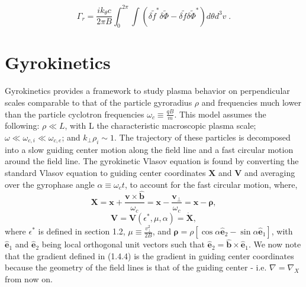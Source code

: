 \documentclass[12pt]{article}
\numberwithin{equation}{subsection}
\begin{document}
   \begin{equation}
      \Gamma_r = \frac{ik_\theta c}{2\pi B}\int_{0}^{2\pi}\int(\delta\widetilde{f}^*\delta\widetilde{\Phi}-\delta\widetilde{f}\delta\widetilde{\Phi}^*)d\theta d^{3}v\;.
   \end{equation}


\section{Gyrokinetics}
   \quad Gyrokinetics provides a framework to study plasma behavior on perpendicular scales comparable to that of the
particle gyroradius $\rho$ and frequencies much lower than the particle cyclotron frequencies $\omega_c \equiv \frac{qB}{m}$. This model assumes
the following: $\rho \ll L$, with L the characteristic macroscopic plasma scale; $\omega \ll \omega_{c,i} \ll \omega_{c,e}$;
and $k_\perp \rho_i \sim 1$\cite{GyroKinAstr}. The trajectory of these particles is decomposed into a slow guiding center motion
along the field line and a fast circular motion around the field line. The gyrokinetic Vlasov equation is found by converting the
standard Vlasov equation to guiding center coordinates $\bm{X}$ and $\bm{V}$ and averaging over the gyrophase angle $\alpha
\equiv \omega_c t$, to account for the fast circular motion, where\cite{FriemanChen},
   \begin{equation}
      \bm{X} = \bm{x} + \frac{\bm{v}\times\bm{\hat{b}}}{\omega_c} = \bm{x} - \frac{\bm{v}_\perp}{\omega_c}
             = \bm{x} - \bm{\rho},
   \end{equation}
   \begin{equation}
      \bm{V} = \bm{V}(\epsilon^*, \mu, \alpha) = \dot{\bm{X}},
   \end{equation}
where $\epsilon^*$ is defined in section 1.2, $\mu \equiv \frac{v_\perp^2}{2B}$, and $\bm{\rho} =
\rho[\cos\alpha\bm{\hat{e}}_2 - \sin\alpha\bm{\hat{e}}_1]$, with $\bm{\hat{e}}_1$ and $\bm{\hat{e}}_2$
being local orthogonal unit vectors such that $\bm{\hat{e}}_2=\bm{\hat{b}}\times\bm{\hat{e}}_1$.
We now note that the gradient defined in (1.4.4) is the gradient in guiding center coordinates because
the geometry of the field lines is that of the guiding center - i.e. $\nabla = \nabla_X$ from now on.
\end{document}
